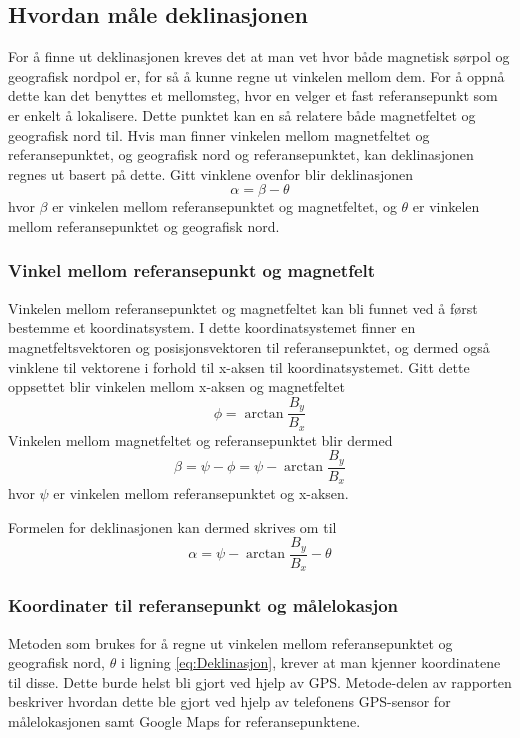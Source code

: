 \subsection{Hvordan måle deklinasjonen}
For å finne ut deklinasjonen kreves det at man vet hvor både magnetisk sørpol og 
geografisk nordpol er, for så å kunne regne ut vinkelen mellom dem. For å oppnå dette 
kan det benyttes et mellomsteg, hvor en velger et fast referansepunkt som er enkelt å lokalisere. Dette punktet kan 
en så relatere både magnetfeltet og geografisk nord til. 
Hvis man finner vinkelen mellom magnetfeltet 
og referansepunktet, og geografisk nord og referansepunktet, kan deklinasjonen 
regnes ut basert på dette. Gitt vinklene ovenfor blir deklinasjonen
\begin{equation}
    \alpha = \beta - \theta
\end{equation}
hvor $\beta$ er vinkelen mellom referansepunktet og magnetfeltet, og $\theta$ er 
vinkelen mellom referansepunktet og geografisk nord.

\subsubsection{Vinkel mellom referansepunkt og magnetfelt}
Vinkelen mellom referansepunktet og magnetfeltet kan bli funnet ved å først bestemme et koordinatsystem. I dette 
koordinatsystemet finner en magnetfeltsvektoren og posisjonsvektoren til referansepunktet, og dermed også vinklene 
til vektorene i forhold til x-aksen til koordinatsystemet. Gitt dette oppsettet blir vinkelen mellom x-aksen og 
magnetfeltet 
\begin{equation}
    \phi = \arctan \frac{B_y}{B_x}
\end{equation}
Vinkelen mellom magnetfeltet og referansepunktet blir dermed
\begin{equation}
    \beta = \psi - \phi = \psi - \arctan \frac{B_y}{B_x}
\end{equation}
hvor $\psi$ er vinkelen mellom referansepunktet og x-aksen.

Formelen for deklinasjonen kan dermed skrives om til
\begin{equation}
    \label{eq:Deklinasjon}
    \alpha = \psi - \arctan \frac{B_y}{B_x} - \theta
\end{equation}

\subsubsection{Koordinater til referansepunkt og målelokasjon}
Metoden som brukes for å regne ut vinkelen mellom referansepunktet og geografisk nord, $\theta$ i ligning 
\eqref{eq:Deklinasjon}, krever at man kjenner koordinatene til disse. Dette burde helst bli gjort ved hjelp av 
GPS. Metode-delen av rapporten beskriver hvordan dette ble gjort ved hjelp av telefonens GPS-sensor for 
målelokasjonen samt Google Maps for referansepunktene.

